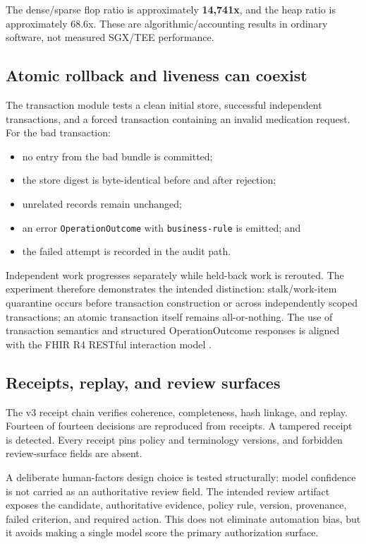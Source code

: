 \documentclass[11pt]{article}
\newcommand{\code}[1]{\texttt{#1}}
\begin{document}
The dense/sparse flop ratio is approximately \textbf{14,741x}, and the heap ratio is approximately 68.6x. These are algorithmic/accounting results in ordinary software, not measured SGX/TEE performance.

\subsection{Atomic rollback and liveness can coexist}

The transaction module tests a clean initial store, successful independent transactions, and a forced transaction containing an invalid medication request. For the bad transaction:

\begin{itemize}
  \item no entry from the bad bundle is committed;
  \item the store digest is byte-identical before and after rejection;
  \item unrelated records remain unchanged;
  \item an error \code{OperationOutcome} with \code{business-rule} is emitted; and
  \item the failed attempt is recorded in the audit path.
\end{itemize}

Independent work progresses separately while held-back work is rerouted. The experiment therefore demonstrates the intended distinction: stalk/work-item quarantine occurs before transaction construction or across independently scoped transactions; an atomic transaction itself remains all-or-nothing. The use of transaction semantics and structured OperationOutcome responses is aligned with the FHIR R4 RESTful interaction model \cite{fhirR4}.

\subsection{Receipts, replay, and review surfaces}

The v3 receipt chain verifies coherence, completeness, hash linkage, and replay. Fourteen of fourteen decisions are reproduced from receipts. A tampered receipt is detected. Every receipt pins policy and terminology versions, and forbidden review-surface fields are absent.

A deliberate human-factors design choice is tested structurally: model confidence is not carried as an authoritative review field. The intended review artifact exposes the candidate, authoritative evidence, policy rule, version, provenance, failed criterion, and required action. This does not eliminate automation bias, but it avoids making a single model score the primary authorization surface.
\end{document}
